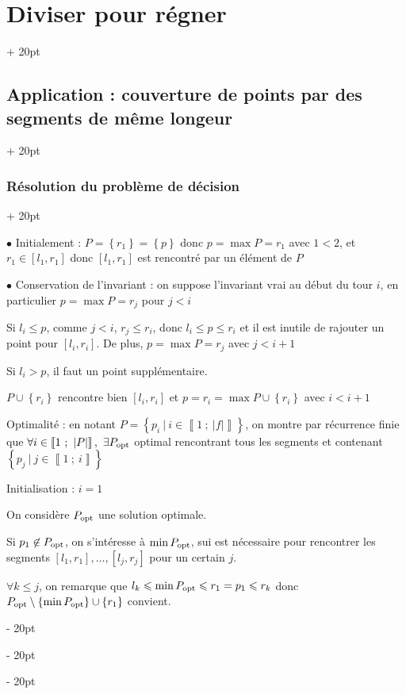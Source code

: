 \documentclass[a4paper, 12pt, twoside]{article}
\newcommand{\nset}[2]{\left\llbracket #1\ ;\ #2 \right\rrbracket}
\newcommand{\set}[1]{\left\{ #1 \right\}}
\newcommand{\abs}[1]{\left\lvert #1 \right\rvert} %
\renewcommand{\le}{\leqslant}
\newcommand{\ind}[1][20pt]{\advance\leftskip + #1}
\newcommand{\deind}[1][20pt]{\advance\leftskip - #1}
\newenvironment{indt}[2][20pt]{#2 \par \ind[#1]}{\par \deind} %
\begin{document}
\begin{indt}{\section{Diviser pour régner}}
\begin{indt}{\subsection{Application : couverture de points par des segments de même longeur}}
\begin{indt}{\subsubsection{Résolution du problème de décision}}
                \vspace{12pt}
                
                $\bullet$ Initialement : $P = \set{r_1} = \set p$ donc $p = \max P = r_1$ avec $1 < 2$, et $r_1 \in [l_1, r_1]$ donc $[l_1, r_1]$ est rencontré par un élément de $P$
                
                \vspace{6pt}
                
                $\bullet$ Conservation de l'invariant : on suppose l'invariant vrai au début du tour $i$, en particulier $p = \max P = r_j$ pour $j < i$
                
                Si $l_i \le p$, comme $j < i$, $r_j \le r_i$, donc $l_i \le p \le r_i$ et il est inutile de rajouter un point pour $[l_i, r_i]$. De plus, $p = \max P = r_j$ avec $j < i + 1$
                
                Si $l_i > p$, il faut un point supplémentaire.
                
                $P \cup \set{r_i}$ rencontre bien $[l_i, r_i]$ et $p = r_i = \max P \cup \set{r_i}$ avec $i < i + 1$
                
                \vspace{12pt}
                
                Optimalité : en notant $P = \set{p_i\ |\ i \in \nset{1}{\abs f}}$, on montre par récurrence finie que $\forall i \in \nset{1}{\abs P},\ \exists P_{\rm opt}$ optimal rencontrant tous les segments et contenant $\set{p_j\ |\ j \in \nset 1 i}$
                
                \vspace{6pt}
                
                Initialisation : $i = 1$
                
                On considère $P_{\rm opt}$ une solution optimale.
                
                Si $p_1 \not \in P_{\rm opt}$, on s'intéresse à $\min P_{\rm opt}$, sui est nécessaire pour rencontrer les segments $[l_1, r_1], \ldots, [l_j, r_j]$ pour un certain $j$.
                
                $\forall k \le j$, on remarque que $l_k \le \min P_{\rm opt} \le r_1 = p_1 \le r_k$ donc $P_{\rm opt} \setminus \set{\min P_{\rm opt}} \cup \set{r_1}$ convient.
                
                \vspace{6pt}
                

\end{indt}
\end{indt}
\end{indt}
\end{document}
